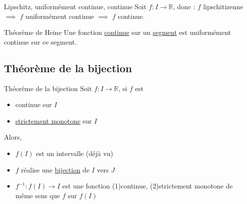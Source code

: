 \begin{Prop}{Lipschitz, uniformément continue, continue}{}
Soit $f : I \to \mathbb{R}$, donc : $f$ lipschitizenne $\implies$ $f$ uniformément continue $\implies$ $f$ continue.
\end{Prop}

\label{Thm: Heine}
\begin{Theorem}{Théorème de Heine}{}
Une fonction \underline{continue} sur un \underline{segment} est uniformément continue sur ce segment.
\end{Theorem}

\subsection{Théorème de la bijection} %
\label{sub:Théorème de la bijection}
\begin{Theorem}{Théorème de la bijection}{}
Soit $f : I \to \mathbb{R}$, si $f$ est 
\begin{itemize}

    \item continue sur $I$ 
    \item \underline{strictement monotone} sur $I$ 


\end{itemize}

Alors, 
\begin{itemize}

    \item $f(I)$ est un intervalle (déjà vu)
    \item $f$ réalise une \underline{bijection} de $I$ vers $J$ 
    \item $f ^{-1} : f(I) \to I$ est une fonction (1)continue, (2)strictement monotone de même sens que $f$ sur $f(I)$

\end{itemize}
\end{Theorem}







